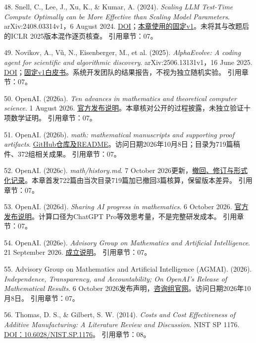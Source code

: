 \documentclass[UTF8,fontset=windows,12pt,a4paper,oneside,openany]{ctexbook}
\begin{document}
48. Snell, C., Lee, J., Xu, K., \& Kumar, A. (2024). \emph{Scaling LLM Test-Time Compute Optimally can be More Effective than Scaling Model Parameters}. arXiv:2408.03314v1，6 August 2024. \href{https://doi.org/10.48550/arXiv.2408.03314}{DOI}；\href{https://arxiv.org/html/2408.03314v1}{本章使用的固定v1}。未将其与改题后的ICLR 2025版本混作逐页核查。
引用章节：07。

49. Novikov, A., Vũ, N., Eisenberger, M., et al. (2025). \emph{AlphaEvolve: A coding agent for scientific and algorithmic discovery}. arXiv:2506.13131v1，16 June 2025. \href{https://doi.org/10.48550/arXiv.2506.13131}{DOI}；\href{https://arxiv.org/html/2506.13131v1}{固定v1白皮书}。系统开发团队的结果报告，不视为独立随机实验。
引用章节：07。

50. OpenAI. (2026a). \emph{Ten advances in mathematics and theoretical computer science}. 1 August 2026. \href{https://openai.com/index/ten-advances-in-mathematics/}{官方发布说明}。本章核对公开的过程披露，未独立验证十项数学证明。
引用章节：07。

51. OpenAI. (2026b). \emph{math: mathematical manuscripts and supporting proof artifacts}. \href{https://github.com/openai/math}{GitHub仓库及README}。访问日期2026年10月8日；目录为719篇稿件、372组相关成果。
引用章节：07。

52. OpenAI. (2026c). \emph{math/history.md}. 7 October 2026更新，\href{https://github.com/openai/math/blob/main/history.md}{撤回、修订与形式化记录}。本章首发722篇由当次目录719篇加已撤回3篇核算，保留版本差异。
引用章节：07。

53. OpenAI. (2026d). \emph{Sharing AI progress in mathematics}. 6 October 2026. \href{https://openai.com/index/sharing-ai-progress-in-mathematics/}{官方发布说明}。计算口径为ChatGPT Pro等效思考量，不是完整研发成本。
引用章节：07。

54. OpenAI. (2026e). \emph{Advisory Group on Mathematics and Artificial Intelligence}. 21 September 2026. \href{https://openai.com/index/advisory-group-on-mathematics-and-ai/}{成立说明}。
引用章节：07。

55. Advisory Group on Mathematics and Artificial Intelligence (AGMAI). (2026). \emph{Independence, Transparency, and Accountability; On OpenAI's Release of Mathematical Results}. 6 October 2026发布声明，\href{https://agmai.org/}{咨询组官网}。访问日期2026年10月8日。
引用章节：07。

56. Thomas, D. S., \& Gilbert, S. W. (2014). \emph{Costs and Cost Effectiveness of Additive Manufacturing: A Literature Review and Discussion}. NIST SP 1176. \href{https://doi.org/10.6028/NIST.SP.1176}{DOI：10.6028/NIST.SP.1176}。
引用章节：08。
\end{document}
